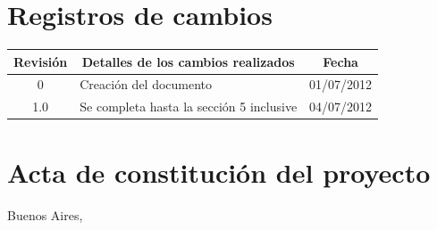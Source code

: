 \documentclass[
11pt, %
codirector, %
]{charter}
\begin{document}
\maketitle
\thispagestyle{empty}
\pagebreak


\thispagestyle{empty}
{\setlength{\parskip}{0pt}
\tableofcontents{}
}
\pagebreak


\section*{Registros de cambios}
\label{sec:registro}


\begin{table}[ht]
\label{tab:registro}
\centering
\begin{tabularx}{\linewidth}{@{}|c|X|c|@{}}
\hline
\rowcolor[HTML]{C0C0C0} 
Revisión & \multicolumn{1}{c|}{\cellcolor[HTML]{C0C0C0}Detalles de los cambios realizados} & Fecha      \\ \hline
0      & Creación del documento                                 & 01/07/2012 \\ \hline
1.0      & Se completa hasta la sección 5 inclusive                 & 04/07/2012 \\ \hline
\end{tabularx}
\end{table}

\pagebreak



\section*{Acta de constitución del proyecto}
\label{sec:acta}

\begin{flushright}
Buenos Aires, \fechaInicioName
\end{flushright}

\vspace{2cm}
\end{document}
